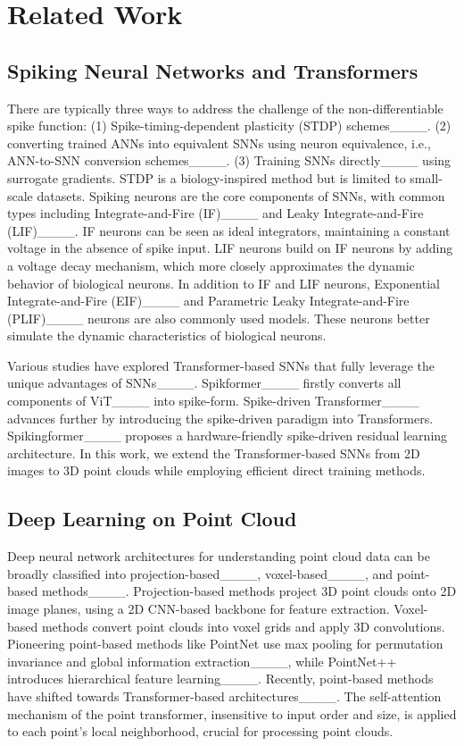 \section{Related Work}
\subsection{Spiking Neural Networks and Transformers}


There are typically three ways to address the challenge of the non-differentiable spike function: (1) Spike-timing-dependent plasticity (STDP) schemes____. (2) converting trained ANNs into equivalent SNNs using neuron equivalence, i.e., ANN-to-SNN conversion schemes____. (3) Training SNNs directly____ using surrogate gradients. STDP is a biology-inspired method but is limited to small-scale datasets. 
Spiking neurons are the core components of SNNs, with common types including Integrate-and-Fire (IF)____ and Leaky Integrate-and-Fire (LIF)____. IF neurons can be seen as ideal integrators, maintaining a constant voltage in the absence of spike input. LIF neurons build on IF neurons by adding a voltage decay mechanism, which more closely approximates the dynamic behavior of biological neurons. In addition to IF and LIF neurons, Exponential Integrate-and-Fire (EIF)____ and Parametric Leaky Integrate-and-Fire (PLIF)____ neurons are also commonly used models. These neurons better simulate the dynamic characteristics of biological neurons. 

Various studies have explored Transformer-based SNNs that fully leverage the unique advantages of SNNs____. Spikformer____ firstly converts all components of ViT____ into spike-form. Spike-driven Transformer____ advances further by introducing the spike-driven paradigm into Transformers. Spikingformer____ proposes a hardware-friendly spike-driven residual learning architecture. In this work, we extend the Transformer-based SNNs from 2D images to 3D point clouds while employing efficient direct training methods.

\subsection{Deep Learning on Point Cloud}


Deep neural network architectures for understanding point cloud data can be broadly classified into projection-based____, voxel-based____, and point-based methods____. Projection-based methods project 3D point clouds onto 2D image planes, using a 2D CNN-based backbone for feature extraction. Voxel-based methods convert point clouds into voxel grids and apply 3D convolutions. Pioneering point-based methods like PointNet use max pooling for permutation invariance and global information extraction____, while PointNet++ introduces hierarchical feature learning____. Recently, point-based methods have shifted towards Transformer-based architectures____. The self-attention mechanism of the point transformer, insensitive to input order and size, is applied to each point's local neighborhood, crucial for processing point clouds.


